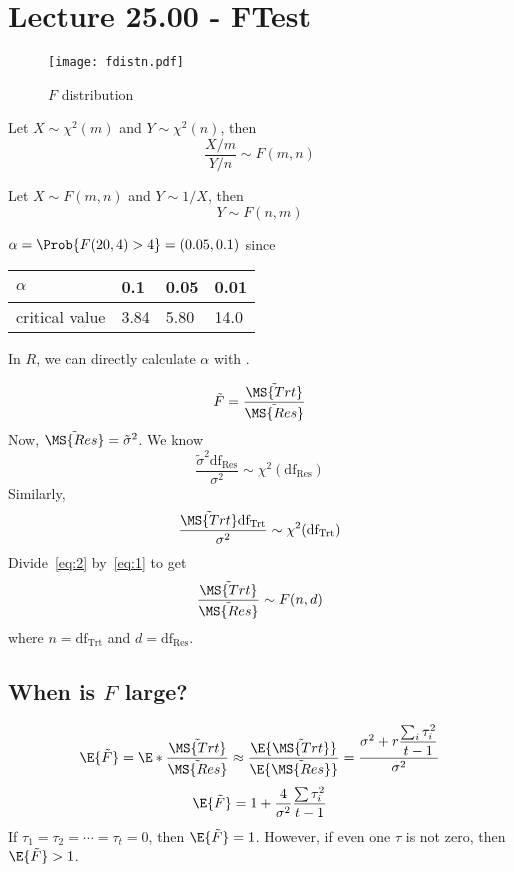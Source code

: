 \section{Lecture 25.00 - FTest}
\begin{figure}[!htbp]
    \centering
    \texttt{[image: fdistn.pdf]}
    \caption{$ F $ distribution}
\end{figure}
\begin{Theorem}{}{}
    Let $ X \sim \chi^2(m) $ and $ Y \sim \chi^2(n) $, then
    \[ \frac{X/m}{Y/n} \sim F(m,n) \]
\end{Theorem}
\begin{Theorem}{}{}
    Let $ X \sim F(m,n) $ and $ Y \sim 1/X $, then
    \[ Y \sim F(n,m) \]
\end{Theorem}
\begin{Example}{}{}
    $ \alpha=\Prob{F(20,4)>4}=(0.05,0.1) $ since
    \begin{center}
        \begin{tabularx}{0.7\linewidth}{@{}YYYY@{}}
            $\alpha$       & 0.1  & 0.05 & 0.01 \\
            \midrule
            critical value & 3.84 & 5.80 & 14.0
        \end{tabularx}
    \end{center}
    In $ R $, we can directly calculate $ \alpha $ with .
\end{Example}
\[ \tilde{F}=\frac{\tilde{\MS{Trt}}}{\tilde{\MS{Res}}}  \]
Now, $ \tilde{\MS{Res}}=\tilde{\sigma}^2 $. We know
\begin{equation}\label{eq:1}
    \frac{\tilde{\sigma}^2\text{df}_\text{Res}}{\sigma^2} \sim \chi^2(\text{df}_{\text{Res}})
\end{equation}
Similarly,
\begin{equation}\label{eq:2}
    \frac{\tilde{\MS{Trt}}\text{df}_\text{Trt}}{\sigma^2} \sim \chi^2(\text{df}_\text{Trt})
\end{equation}
Divide~\ref{eq:2} by~\ref{eq:1} to get
\[ \frac{\tilde{\MS{Trt}}}{\tilde{\MS{Res}}} \sim F(n,d) \]
where $ n=\text{df}_\text{Trt} $ and $ d=\text{df}_\text{Res} $.

\subsection*{When is $ F $ large?}
\[ \E{\tilde{F}}=
    \E*{\frac{\tilde{\MS{Trt}}}{\tilde{\MS{Res}}}}\approx
    \frac{\E{\tilde{\MS{Trt}}}}{\E{\tilde{\MS{Res}}}}
    =\frac{\sigma^2+r \dfrac{\sum_{i} \tau_i^2}{t-1} }{\sigma^2}  \]
\[ \E{\tilde{F}}=1+\frac{4}{\sigma^2} \frac{\sum \tau_i^2 }{t-1}  \]
If $ \tau_1=\tau_2=\cdots=\tau_t=0 $, then $ \E{\tilde{F}}=1 $.
However, if even one $ \tau $ is not zero, then $ \E{\tilde{F}}>1 $.

